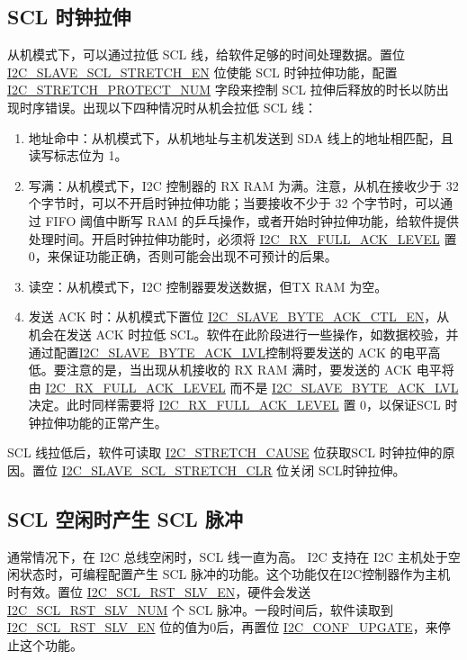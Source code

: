 \documentclass[main\_\_CN.tex]{subfiles}
\begin{document}
\subsection{SCL 时钟拉伸}
从机模式下，可以通过拉低 SCL 线，给软件足够的时间处理数据。置位 \hyperref[fielddesc:I2CSLAVESCLSTRETCHEN]{I2C\_SLAVE\_SCL\_STRETCH\_EN} 位使能 SCL 时钟拉伸功能，配置 \hyperref[fielddesc:I2CSTRETCHPROTECTNUM]{I2C\_STRETCH\_PROTECT\_NUM} 字段来控制 SCL 拉伸后释放的时长以防出现时序错误。出现以下四种情况时从机会拉低 SCL 线：

\begin{enumerate}
\item 地址命中：从机模式下，从机地址与主机发送到 SDA 线上的地址相匹配，且读写标志位为 1。
\item 写满：从机模式下，I2C 控制器的 RX RAM 为满。注意，从机在接收少于 32 个字节时，可以不开启时钟拉伸功能；当要接收不少于 32 个字节时，可以通过 FIFO 阈值中断写 RAM 的乒乓操作，或者开始时钟拉伸功能，给软件提供处理时间。开启时钟拉伸功能时，必须将 \hyperref[fielddesc:I2CRXFULLACKLEVEL]{I2C\_RX\_FULL\_ACK\_LEVEL} 置 0，来保证功能正确，否则可能会出现不可预计的后果。
\item 读空：从机模式下，I2C 控制器要发送数据，但TX RAM 为空。
\item 发送 ACK 时：从机模式下置位 \hyperref[fielddesc:I2CSLAVEBYTEACKCTLEN]{I2C\_SLAVE\_BYTE\_ACK\_CTL\_EN}，从机会在发送 ACK 时拉低 SCL。软件在此阶段进行一些操作，如数据校验，并通过配置\hyperref[fielddesc:I2CSLAVEBYTEACKLVL]{I2C\_SLAVE\_BYTE\_ACK\_LVL}控制将要发送的 ACK 的电平高低。要注意的是，当出现从机接收的 RX RAM 满时，要发送的 ACK 电平将由 \hyperref[fielddesc:I2CRXFULLACKLEVEL]{I2C\_RX\_FULL\_ACK\_LEVEL} 而不是 \hyperref[fielddesc:I2CSLAVEBYTEACKLVL]{I2C\_SLAVE\_BYTE\_ACK\_LVL} 决定。此时同样需要将 \hyperref[fielddesc:I2CRXFULLACKLEVEL]{I2C\_RX\_FULL\_ACK\_LEVEL} 置 0，以保证SCL 时钟拉伸功能的正常产生。
\end{enumerate}

SCL 线拉低后，软件可读取 \hyperref[fielddesc:I2CSTRETCHCAUSE]{I2C\_STRETCH\_CAUSE} 位获取SCL 时钟拉伸的原因。置位 \hyperref[fielddesc:I2CSLAVESCLSTRETCHCLR]{I2C\_SLAVE\_SCL\_STRETCH\_CLR} 位关闭 SCL时钟拉伸。

\subsection{SCL 空闲时产生 SCL 脉冲}
通常情况下，在 I2C 总线空闲时，SCL 线一直为高。\chipname{} I2C 支持在 I2C 主机处于空闲状态时，可编程配置产生 SCL 脉冲的功能。这个功能仅在I2C控制器作为主机时有效。置位 \hyperref[fielddesc:I2CSCLRSTSLVEN]{I2C\_SCL\_RST\_SLV\_EN}，硬件会发送 \hyperref[fielddesc:I2CSCLRSTSLVNUM]{I2C\_SCL\_RST\_SLV\_NUM} 个 SCL 脉冲。一段时间后，软件读取到 \hyperref[fielddesc:I2CSCLRSTSLVEN]{I2C\_SCL\_RST\_SLV\_EN} 位的值为0后，再置位 \hyperref[fielddesc:I2CCONFUPGATE]{I2C\_CONF\_UPGATE}，来停止这个功能。
\end{document}
